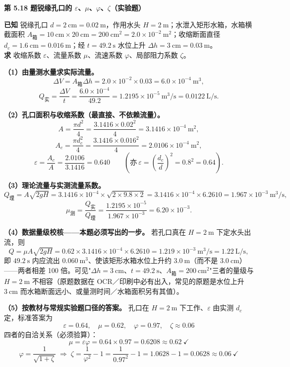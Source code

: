 \noindent\textbf{第 5.18 题\quad 锐缘孔口的 $\varepsilon$、$\mu$、$\varphi$、$\zeta$（实验题）}

\begin{jie}
\textbf{已知} 锐缘孔口 $d=2\ \mathrm{cm}=0.02\ \mathrm{m}$，作用水头 $H=2\ \mathrm{m}$；水泄入矩形水箱，水箱横截面积 $A_{\text{箱}}=10\ \mathrm{cm}\times20\ \mathrm{cm}=200\ \mathrm{cm^2}=2.0\times10^{-2}\ \mathrm{m^2}$；收缩断面直径 $d_c=1.6\ \mathrm{cm}=0.016\ \mathrm{m}$；经 $t=49.2\ \mathrm{s}$ 水位上升 $\Delta h=3\ \mathrm{cm}=0.03\ \mathrm{m}$。\\
\textbf{求} 收缩系数 $\varepsilon$、流量系数 $\mu$、流速系数 $\varphi$、局部阻力系数 $\zeta$。

\textbf{（1）由量测水量求实际流量。}
\[\Delta V=A_{\text{箱}}\Delta h=2.0\times10^{-2}\times0.03=6.0\times10^{-4}\ \mathrm{m^3},\]
\[Q_{\text{实}}=\frac{\Delta V}{t}=\frac{6.0\times10^{-4}}{49.2}=1.2195\times10^{-5}\ \mathrm{m^3/s}=0.0122\ \mathrm{L/s}.\]

\textbf{（2）孔口面积与收缩系数（最直接、不依赖流量）。}
\[A=\frac{\pi d^2}{4}=\frac{3.1416\times0.02^2}{4}=3.1416\times10^{-4}\ \mathrm{m^2},\]
\[A_c=\frac{\pi d_c^2}{4}=\frac{3.1416\times0.016^2}{4}=2.0106\times10^{-4}\ \mathrm{m^2},\]
\[\boxed{\varepsilon=\frac{A_c}{A}=\frac{2.0106}{3.1416}=0.640}\qquad\left(\text{亦}\ \varepsilon=\left(\frac{d_c}{d}\right)^2=0.8^2=0.64\right).\]

\textbf{（3）理论流量与实测流量系数。}
\[Q_{\text{理}}=A\sqrt{2gH}=3.1416\times10^{-4}\times\sqrt{2\times9.8\times2}
=3.1416\times10^{-4}\times6.2610=1.967\times10^{-3}\ \mathrm{m^3/s},\]
\[\mu_{\text{测}}=\frac{Q_{\text{实}}}{Q_{\text{理}}}=\frac{1.2195\times10^{-5}}{1.967\times10^{-3}}=6.20\times10^{-3}.\]

\textbf{（4）数据量级校核——本题必须写出的一步。} 若孔口真在 $H=2\ \mathrm{m}$ 下定水头出流，则
\[Q=\mu A\sqrt{2gH}=0.62\times3.1416\times10^{-4}\times6.2610=1.219\times10^{-3}\ \mathrm{m^3/s}=1.22\ \mathrm{L/s},\]
即 $49.2\ \mathrm{s}$ 内应流出 $0.060\ \mathrm{m^3}$、使该矩形水箱水位上升约 $3.0\ \mathrm{m}$（而不是 $3.0\ \mathrm{cm}$）——两者相差 100 倍。可见"$\Delta h=3\ \mathrm{cm}$、$t=49.2\ \mathrm{s}$、$A_{\text{箱}}=200\ \mathrm{cm^2}$"三者的量级与 $H=2\ \mathrm{m}$ 不相容（原题数据在 OCR／印刷中必有出入，常见的原题是水位上升 $3\ \mathrm{cm}$ 而水箱断面远小、或量测时间／水箱面积另有其值）。

\textbf{（5）按教材与常规实验题口径的答案。} 孔口在 $H=2\ \mathrm{m}$ 下工作、$\varepsilon$ 由实测 $d_c$ 定，标准答案为
\[\boxed{\varepsilon=0.64,\quad \mu=0.62,\quad \varphi=0.97,\quad \zeta\approx0.06}\]
四者的自洽关系（必须验算）：
\[\mu=\varepsilon\varphi=0.64\times0.97=0.6208\approx0.62\ \checkmark\]
\[\varphi=\frac{1}{\sqrt{1+\zeta}}\;\Longrightarrow\;\zeta=\frac{1}{\varphi^2}-1=\frac{1}{0.97^2}-1=1.0628-1=0.0628\approx0.06\ \checkmark\]


\end{jie}
